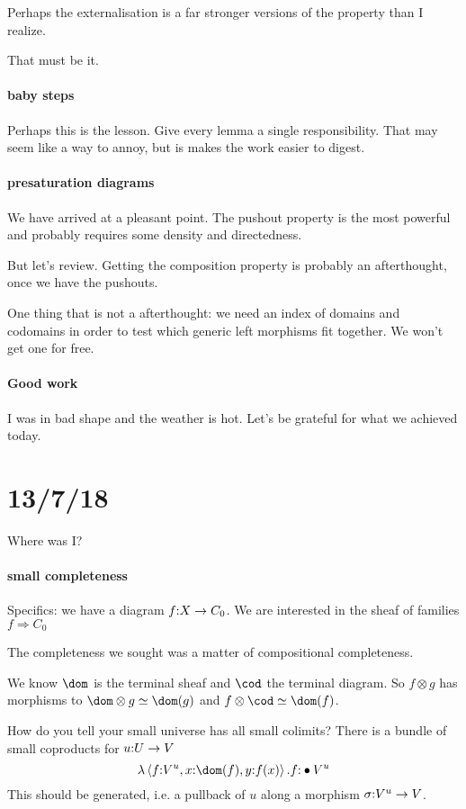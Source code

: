 \documentclass[csh.tex]{subfiles}
\begin{document}
Perhaps the externalisation is a far stronger versions of the property than I realize.

That must be it.

\paragraph{baby steps}
Perhaps this is the lesson. Give every lemma a single responsibility. That may seem like a way to annoy, but is makes the work easier to digest.

\paragraph{presaturation diagrams}
We have arrived at a pleasant point.
The pushout property is the most powerful and probably requires some density and directedness.

But let's review.
Getting the composition property is probably an afterthought, once we have the pushouts. 

One thing that is not a afterthought: we need an index of domains and codomains in order to test which generic left morphisms fit together. We won't get one for free.

\paragraph{Good work}
I was in bad shape and the weather is hot. Let's be grateful for what we achieved today.

\section{13/7/18}
Where was I?


\paragraph{small completeness}

Specifics: we have a diagram $f\mathord : X \to C_0$. We are interested in the sheaf of families $f\Rightarrow C_0$

The completeness we sought was a matter of compositional completeness.

We know $\dom$ is the terminal sheaf and $\cod$ the terminal diagram.
So $f\otimes g$ has morphisms to $\dom\otimes g \simeq \dom(g)$ and $f\otimes\cod \simeq \dom(f)$.

How do you tell your small universe has all small colimits?
There is a bundle of small coproducts for $u\mathord : U\to V$
\[\function{ \tuplet{f\of V^u,x\of \dom(f),y\of f(x)} } f\of\bullet V^u\]
This should be generated, i.e. a pullback of $u$ along a morphism $\sigma\mathord : V^u\to V$.
\end{document}
